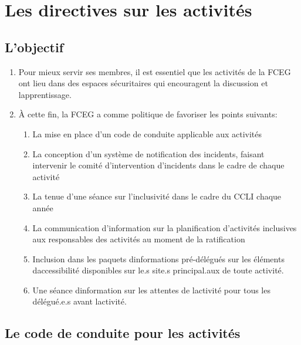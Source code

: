 \section{Les directives sur les activités}
\label{les-directives-sur-les-activites}

\subsection{L'objectif}
\label{lobjectif-3}

\begin{enumerate}
 \item
  Pour mieux servir ses membres, il est essentiel que les activités de la FCEG ont lieu dans des espaces sécuritaires qui encouragent la discussion et l\textquotesingle apprentissage.
 \item
  À cette fin, la FCEG a comme politique de favoriser les points suivants:

  \begin{enumerate}
   \item
    La mise en place d'un code de conduite applicable aux activités
   \item
    La conception d'un système de notification des incidents, faisant intervenir le comité d'intervention d'incidents dans le cadre de chaque activité
   \item
    La tenue d'une séance sur l'inclusivité dans le cadre du CCLI chaque année
   \item
    La communication d'information sur la planification d'activités inclusives aux responsables des activités au moment de la ratification
   \item
    Inclusion dans les paquets d\textquotesingle informations pré-délégués sur les éléments d\textquotesingle accessibilité disponibles sur le.s site.s principal.aux de toute activité.
   \item
    Une séance d\textquotesingle information sur les attentes de l\textquotesingle activité pour tous les délégué.e.s avant l\textquotesingle activité.
  \end{enumerate}
\end{enumerate}

\subsection{\texorpdfstring{Le code de conduite pour les activités }{Le code de conduite pour les activités }}\label{exorpdfstringle-code-de-conduite-pour-les-activites-le-code-de-conduite-pour-les-activites}

